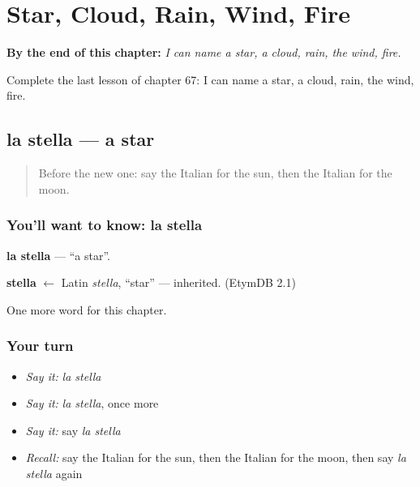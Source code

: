 
\chapter{Star, Cloud, Rain, Wind, Fire}
\label{ch:it-star-cloud-rain-wind-fire}

\begin{chapteropening}
\textbf{By the end of this chapter:} \emph{I can name a star, a cloud, rain, the wind, fire.}

Complete the last lesson of chapter 67: I can name a star, a cloud, rain, the wind, fire.
\end{chapteropening}

\section[la stella]{la stella — a star}

\label{lesson:IT-C67-stella}



\begin{quote}
Before the new one: say the Italian for the sun, then the Italian for the moon.
\end{quote}

\subsection*{You'll want to know: la stella}
\textbf{la stella} — \textquotedblleft{}a star\textquotedblright{}.

\begin{cousinweb}
\textbf{stella} $\leftarrow$ Latin \emph{stella}, \textquotedblleft{}star\textquotedblright{} — inherited. (EtymDB 2.1)
\end{cousinweb}

\begin{grammarlens}[title={What you've built}]
One more word for this chapter.
\end{grammarlens}

\subsection*{Your turn}
\begin{itemize}
\raggedright
  \item \emph{Say it:} \emph{la stella}
  \item \emph{Say it:} \emph{la stella}, once more
  \item \emph{Say it:} say \emph{la stella}
  \item \emph{Recall:} say the Italian for the sun, then the Italian for the moon, then say \emph{la stella} again
\end{itemize}

